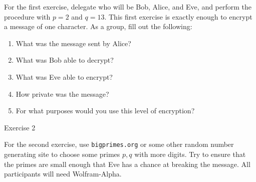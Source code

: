\documentclass{article}
\begin{document}
    For the first exercise, delegate who will be Bob, Alice, and Eve, and perform the procedure with $p=2$ and $q=13$. This first exercise is exactly enough to encrypt a message of one character. As a group, fill out the following:
    \begin{enumerate}
        \item What was the message sent by Alice? 

            \TextField[width=6in,height=1in, bordercolor=0 0 0, name=p1q1, multiline=true]{}

        \item What was Bob able to decrypt?

            \TextField[width=6in,height=1in, bordercolor=0 0 0, name=p1q2, multiline=true]{}

        \item What was Eve able to encrypt?

            \TextField[width=6in,height=1in, bordercolor=0 0 0, name=p1q3, multiline=true]{}

        \item How private was the message?

            \TextField[width=6in,height=1in, bordercolor=0 0 0, name=p1q4, multiline=true]{}

        \item For what purposes would you use this level of encryption?

            \TextField[width=6in,height=1in, bordercolor=0 0 0, name=p1q5, multiline=true]{}

    \end{enumerate}

\newpage

    \huge Exercise 2
    \normalsize

    For the second exercise, use \verb|bigprimes.org| or some other random number generating site to choose some primes $p,q$ with more digits. Try to ensure that the primes are small enough that Eve has a chance at breaking the message. All participants will need Wolfram-Alpha.
\end{document}
